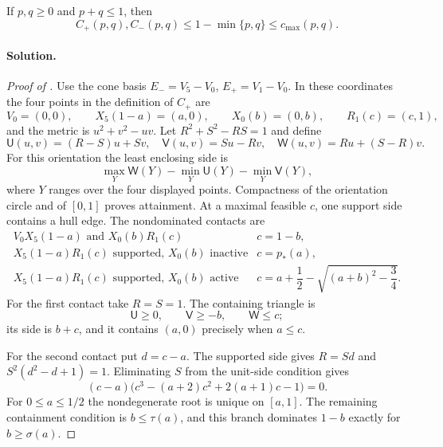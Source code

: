 \begin{lemma}
\label{lem:app-common-pair-domination}
If $p,q\ge0$ and $p+q\le1$, then
\[
 C_+(p,q),C_-(p,q)\le1-\min\{p,q\}\le c_{\max}(p,q).
\]
\end{lemma}



\paragraph{Solution.}

\begin{proof}[Proof of ]
Use the cone basis $E_-=V_5-V_0$, $E_+=V_1-V_0$.  In these coordinates the
four points in the definition of $C_+$ are
\[
 V_0=(0,0),\qquad X_5(1-a)=(a,0),\qquad X_0(b)=(0,b),
 \qquad R_1(c)=(c,1),
\]
and the metric is $u^2+v^2-uv$.  Let $R^2+S^2-RS=1$ and define
\[
 \mathsf U(u,v)=(R-S)u+Sv,
 \quad \mathsf V(u,v)=Su-Rv,
 \quad \mathsf W(u,v)=Ru+(S-R)v.
\]
For this orientation the least enclosing side is
\[
 \max_Y\mathsf W(Y)-\min_Y\mathsf U(Y)-\min_Y\mathsf V(Y),
\]
where $Y$ ranges over the four displayed points.  Compactness of the
orientation circle and of $[0,1]$ proves attainment.  At a maximal feasible
$c$, one support side contains a hull edge.  The nondominated contacts are
\[
\begin{array}{c|c}
V_0X_5(1-a)\text{ and }X_0(b)R_1(c)&c=1-b,\\
X_5(1-a)R_1(c)\text{ supported, }X_0(b)\text{ inactive}&c=p_*(a),\\
X_5(1-a)R_1(c)\text{ supported, }X_0(b)\text{ active}
 &c=a+\dfrac12-\sqrt{(a+b)^2-\dfrac34}.
\end{array}
\]
For the first contact take $R=S=1$.  The containing triangle is
\[
 \mathsf U\ge0,\qquad \mathsf V\ge-b,\qquad \mathsf W\le c;
\]
its side is $b+c$, and it contains $(a,0)$ precisely when $a\le c$.

For the second contact put $d=c-a$.  The supported side gives $R=Sd$ and
$S^2(d^2-d+1)=1$.  Eliminating $S$ from the unit-side condition gives
\[
(c-a)\bigl(c^3-(a+2)c^2+2(a+1)c-1\bigr)=0.
\]
For $0\le a\le1/2$ the nondegenerate root is unique on $[a,1]$.  The
remaining containment condition is $b\le\tau(a)$, and this branch dominates
$1-b$ exactly for $b\ge\sigma(a)$.


\end{proof}
